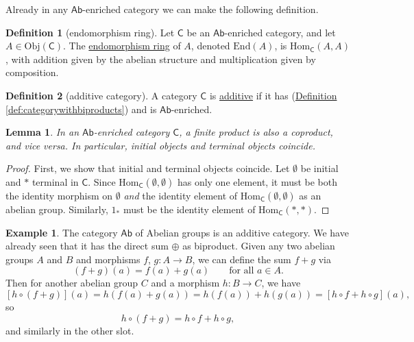 \documentclass[a4paper]{report}
\newcommand{\defn}[1]{\ul{#1}}
\newcommand{\Obj}{\mathrm{Obj}}
\newcommand{\Hom}{\mathrm{Hom}}
\theoremstyle{definition}
\newtheorem{definition}{Definition}[section]
\newtheorem{example}{Example}[section]
\theoremstyle{plain}
\newtheorem{lemma}{Lemma}[section]
\theoremstyle{remark}
\begin{document}
Already in any $\mathsf{Ab}$-enriched category we can make the following definition.
\begin{definition}[endomorphism ring]
  \label{def:endomorphismring}
  Let $\mathsf{C}$ be an $\mathsf{Ab}$-enriched category, and let $A \in \Obj(\mathsf{C})$. The \defn{endomorphism ring} of $A$, denoted $\mathrm{End}(A)$, is $\Hom_{\mathsf{C}}(A, A)$, with addition given by the abelian structure and multiplication given by composition.
\end{definition}

\begin{definition}[additive category]
  \label{def:additivecategory}
  A category $\mathsf{C}$ is \defn{additive} if it has (\hyperref[def:categorywithbiproducts]{Definition \ref*{def:categorywithbiproducts}}) and is $\mathsf{Ab}$-enriched.
\end{definition}

\begin{lemma}
  \label{lemma:abeliancategorycoproductsareproducts}
  In an $\mathsf{Ab}$-enriched category $\mathsf{C}$, a finite product is also a coproduct, and vice versa. In particular, initial objects and terminal objects coincide.
\end{lemma}
\begin{proof}
  First, we show that initial and terminal objects coincide. Let $\emptyset$ be initial and $*$ terminal in $\mathsf{C}$. Since $\Hom_{\mathsf{C}}(\emptyset, \emptyset)$ has only one element, it must be both the identity morphism on $\emptyset$ \emph{and} the identity element of $\Hom_{\mathsf{C}}(\emptyset, \emptyset)$ as an abelian group. Similarly, $1_{*}$ must be the identity element of $\Hom_{\mathsf{C}}(*, *)$.
\end{proof}

\begin{example}
  The category $\mathsf{Ab}$ of Abelian groups is an additive category. We have already seen that it has the direct sum $\oplus$ as biproduct. Given any two abelian groups $A$ and $B$ and morphisms $f$, $g\colon A \to B$, we can define the sum $f + g$ via
  \begin{equation*}
    (f + g)(a) = f(a) + g(a)\qquad\text{for all }a \in A.
  \end{equation*}
  Then for another abelian group $C$ and a morphism $h\colon B \to C$, we have
  \begin{equation*}
    \left[ h \circ (f+g) \right](a) = h(f(a) + g(a)) = h(f(a)) + h(g(a)) = \left[ h \circ f + h \circ g \right](a),
  \end{equation*}
  so 
  \begin{equation*}
    h \circ (f+g) =h \circ f + h \circ g,
  \end{equation*}
  and similarly in the other slot.
\end{example}
\end{document}
